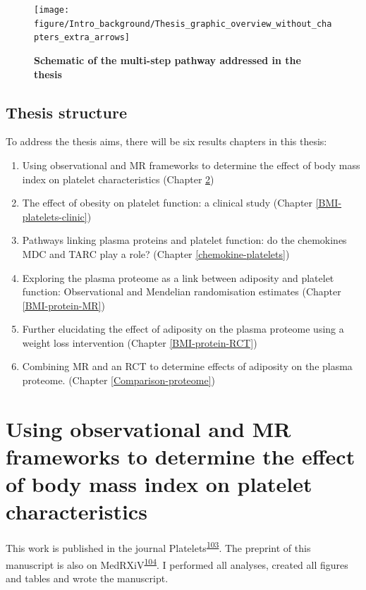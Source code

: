 \documentclass[11pt,twoside]{bristolthesis}
\providecommand{\tightlist}{%
  \setlength{\itemsep}{0pt}\setlength{\parskip}{0pt}}
\begin{document}
\begin{figure}

{\centering \texttt{[image: figure/Intro\_background/Thesis\_graphic\_overview\_without\_chapters\_extra\_arrows]} 

}

\caption[Schematic of the multi-step pathway addressed in the thesis]{\textbf{Schematic of the multi-step pathway addressed in the thesis}}\label{fig:Thesis-schematic}
\end{figure}
\hypertarget{thesis-structure}{%
\section{Thesis structure}\label{thesis-structure}}

To address the thesis aims, there will be six results chapters in this thesis:
\begin{enumerate}
\def\labelenumi{\arabic{enumi})}
\tightlist
\item
  Using observational and MR frameworks to determine the effect of body mass index on platelet characteristics (Chapter \ref{BMI-platelets-INTERVAL})
\item
  The effect of obesity on platelet function: a clinical study (Chapter \ref{BMI-platelets-clinic})
\item
  Pathways linking plasma proteins and platelet function: do the chemokines MDC and TARC play a role? (Chapter \ref{chemokine-platelets})
\item
  Exploring the plasma proteome as a link between adiposity and platelet function: Observational and Mendelian randomisation estimates (Chapter \ref{BMI-protein-MR})
\item
  Further elucidating the effect of adiposity on the plasma proteome using a weight loss intervention (Chapter \ref{BMI-protein-RCT})
\item
  Combining MR and an RCT to determine effects of adiposity on the plasma proteome. (Chapter \ref{Comparison-proteome})
\end{enumerate}
\hypertarget{BMI-platelets-INTERVAL}{%
\chapter{Using observational and MR frameworks to determine the effect of body mass index on platelet characteristics}\label{BMI-platelets-INTERVAL}}

This work is published in the journal Platelets\textsuperscript{\protect\hyperlink{ref-Goudswaard2022}{103}}. The preprint of this manuscript is also on MedRXiV\textsuperscript{\protect\hyperlink{ref-Goudswaard2021a}{104}}. I performed all analyses, created all figures and tables and wrote the manuscript.
\end{document}
